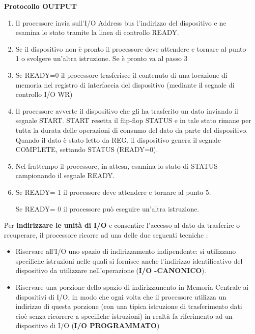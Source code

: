 \documentclass[12pt]{article}
\begin{document}
\newpage
\textbf{Protocollo OUTPUT}
\begin{enumerate}
    \item Il processore invia sull’I/O Address bus l’indirizzo del dispositivo e ne esamina lo stato tramite la linea di controllo READY.
    \item Se il dispositivo non è pronto il processore deve attendere e tornare al punto 1 o svolgere un’altra istruzione. Se è pronto va al passo 3
    \item Se READY=0 il processore trasferisce il contenuto di una locazione di memoria nel registro di interfaccia del dispositivo (mediante il segnale di controllo I/O WR)
    \item Il processore avverte il dispositivo che gli ha trasferito un dato inviando il segnale START. START resetta il flip-flop STATUS e in tale stato rimane per tutta la durata delle operazioni di consumo del dato da parte del dispositivo. Quando il dato è stato letto da REG, il dispositivo genera il segnale COMPLETE, settando STATUS (READY=0).
    \item Nel frattempo il processore, in attesa, esamina lo stato di STATUS campionando il segnale READY.
    \item  Se READY= 1 il processore deve attendere e tornare al punto 5.\par\medskip\noindent
    Se READY= 0 il processore può eseguire un’altra istruzione.\par\medskip\noindent
\end{enumerate}
Per \textbf{indirizzare le unità di I/O} e consentire l’accesso al dato da trasferire o recuperare, il processore ricorre ad una delle due seguenti tecniche :
\begin{itemize}
    \item Riservare all’I/O uno spazio di indirizzamento indipendente: si utilizzano specifiche istruzioni nelle quali si fornisce anche l’indirizzo identificativo del dispositivo da utilizzare nell’operazione (\textbf{I/O -CANONICO}).
    \item Riservare una porzione dello spazio di indirizzamento in Memoria Centrale ai dispositivi di I/O, in modo che ogni volta che il processore utilizza un indirizzo di questa porzione (con una tipica istruzione di trasferimento dati cioè senza ricorrere a specifiche istruzioni) in realtà fa riferimento ad un dispositivo di I/O (\textbf{I/O PROGRAMMATO})
\end{itemize}
\newpage
\end{document}
